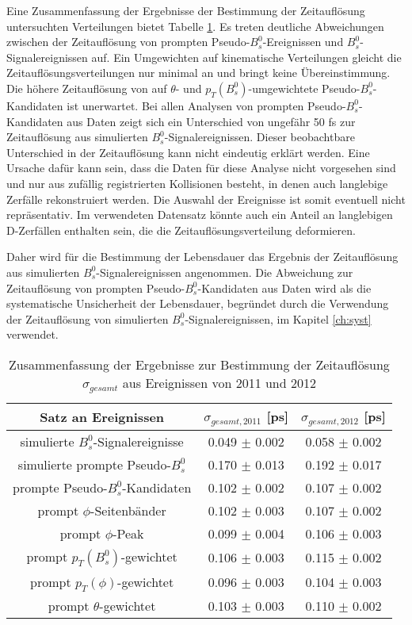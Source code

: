 \documentclass{article}
\begin{document}
Eine Zusammenfassung der Ergebnisse der Bestimmung der Zeitauflösung  untersuchten Verteilungen bietet Tabelle \ref{table:tresresultsall}. %
Es treten deutliche Abweichungen zwischen der Zeitauflösung von prompten Pseudo-$B_s^0$-Ereignissen und $B_s^0$-Signalereignissen auf. Ein Umgewichten auf kinematische Verteilungen gleicht die Zeitauflösungsverteilungen nur minimal an und bringt keine Übereinstimmung. Die höhere Zeitauflösung von auf $\theta$- und $p_T(B_s^0)$-umgewichtete Pseudo-$B_s^0$-Kandidaten ist unerwartet. Bei allen Analysen von prompten Pseudo-$B_s^0$-Kandidaten aus Daten zeigt sich ein Unterschied von ungefähr 50 fs zur Zeitauflösung aus simulierten $B_s^0$-Signalereignissen. Dieser beobachtbare Unterschied in der Zeitauflösung kann nicht eindeutig erklärt werden. Eine Ursache dafür kann sein, dass die Daten für diese Analyse nicht vorgesehen sind und nur aus zufällig registrierten Kollisionen besteht, in denen auch langlebige Zerfälle rekonstruiert werden. Die Auswahl der Ereignisse ist somit eventuell nicht repräsentativ. Im verwendeten Datensatz könnte auch ein Anteil an langlebigen D-Zerfällen enthalten sein, die die Zeitauflösungsverteilung deformieren. 

Daher wird für die Bestimmung der Lebensdauer das Ergebnis der Zeitauflösung aus simulierten $B_s^0$-Signalereignissen angenommen. Die Abweichung zur Zeitauflösung von prompten Pseudo-$B_s^0$-Kandidaten aus Daten wird als die systematische Unsicherheit der Lebensdauer, begründet durch die Verwendung der Zeitauflösung von simulierten $B_s^0$-Signalereignissen, im Kapitel \ref{ch:syst} verwendet.

\begin{table}[h!]
\noindent\begin{centering}
\begin{tabular}{c|c|c}
Satz an Ereignissen& $\sigma_{gesamt,2011}$ [ps] & $\sigma_{gesamt,2012}$ [ps]\tabularnewline
\hline 
\hline
simulierte $B_s^0$-Signalereignisse & 0.049 $\pm$ 0.002 & 0.058 $\pm$ 0.002\tabularnewline
\hline
simulierte prompte Pseudo-$B_s^0$&0.170 $\pm$ 0.013 & 0.192 $\pm$ 0.017 \tabularnewline
prompte Pseudo-$B_s^0$-Kandidaten& 0.102 $\pm$ 0.002 & 0.107 $\pm$ 0.002\tabularnewline
\hline
prompt $\phi$-Seitenbänder &0.102 $\pm$ 0.003&0.107 $\pm$ 0.002 \tabularnewline
prompt $\phi$-Peak &0.099 $\pm$ 0.004 &0.106 $\pm$ 0.003 \tabularnewline
\hline
prompt $p_T (B_s^0)$-gewichtet& 0.106 $\pm$ 0.003 & 0.115 $\pm$ 0.002 \tabularnewline %
prompt $p_T (\phi)$-gewichtet& 0.096 $\pm$ 0.003 & 0.104 $\pm$ 0.003 \tabularnewline%
prompt $\theta$-gewichtet& 0.103 $\pm$ 0.003 & 0.110 $\pm$ 0.002 \tabularnewline%
\end{tabular}
\par \end{centering}
\caption{Zusammenfassung der Ergebnisse zur Bestimmung der Zeitauflösung $\sigma_{gesamt}$ aus Ereignissen von 2011 und 2012}
\label{table:tresresultsall}
\end{table}
\end{document}
